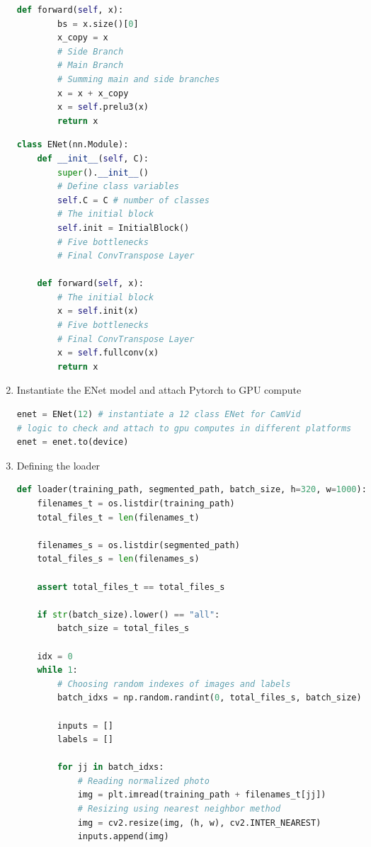 \begin{enumerate}
\begin{lstlisting}[language=Python]
    def forward(self, x):
        bs = x.size()[0]
        x_copy = x
        # Side Branch
        # Main Branch
        # Summing main and side branches
        x = x + x_copy
        x = self.prelu3(x)
        return x
        \end{lstlisting}

          \begin{lstlisting}[language=Python]
class ENet(nn.Module):
    def __init__(self, C):
        super().__init__()
        # Define class variables
        self.C = C # number of classes
        # The initial block
        self.init = InitialBlock()
        # Five bottlenecks
        # Final ConvTranspose Layer

    def forward(self, x):
        # The initial block
        x = self.init(x)
        # Five bottlenecks
        # Final ConvTranspose Layer
        x = self.fullconv(x)
        return x
        \end{lstlisting}
    \item Instantiate the ENet model and attach Pytorch to GPU compute \textit{}
          \begin{lstlisting}[language=Python]
enet = ENet(12) # instantiate a 12 class ENet for CamVid
# logic to check and attach to gpu computes in different platforms
enet = enet.to(device)
        \end{lstlisting}
    \item Defining the loader
          \begin{lstlisting}[language=Python]
def loader(training_path, segmented_path, batch_size, h=320, w=1000):
    filenames_t = os.listdir(training_path)
    total_files_t = len(filenames_t)

    filenames_s = os.listdir(segmented_path)
    total_files_s = len(filenames_s)

    assert total_files_t == total_files_s

    if str(batch_size).lower() == "all":
        batch_size = total_files_s

    idx = 0
    while 1:
        # Choosing random indexes of images and labels
        batch_idxs = np.random.randint(0, total_files_s, batch_size)

        inputs = []
        labels = []

        for jj in batch_idxs:
            # Reading normalized photo
            img = plt.imread(training_path + filenames_t[jj])
            # Resizing using nearest neighbor method
            img = cv2.resize(img, (h, w), cv2.INTER_NEAREST)
            inputs.append(img)


\end{lstlisting}
\end{enumerate}
